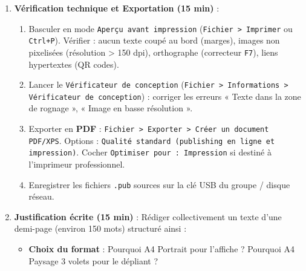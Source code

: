 \documentclass[11pt]{article}
\newcommand{\cle}[1]{{\popxbold\color{popdark}#1}}
\begin{document}
\begin{enumerate}
\begin{enumerate}
        \item \textbf{Volet 1 (Couverture)} : Reprendre l'identité visuelle de l'affiche (cohérence), titre, dates, image accrocheuse, mention \og Programme détaillé à l'intérieur \fg{}.
        \item \textbf{Volets 2 à 5 (Intérieur)} : Structurer le programme par jour. Utiliser des \cle{colonnes} (2 colonnes par volet) ou un tableau inséré pour aligner Heure / Événement / Lieu. Une police lisible (corps 10-11 pt), interligne 1,15.
        \item \textbf{Volet 6 (Dos/Rabat)} : Partenaires (logos alignés), Contacts, Mentions légales (ex: \og Publication Club Informatique - Collège La Réussite \fg{}), QR Code inscription ateliers.
        \item Utiliser les \cle{gabarits} (menu \texttt{Disposition > Gabarits}) pour poser les éléments fixes (fond coloré, numérotation de page, logo filigrane) sur toutes les pages intérieures d'un coup.
    \end{enumerate}
    \item \textbf{Vérification technique et Exportation (15 min)} :
    \begin{enumerate}
        \item Basculer en mode \texttt{Aperçu avant impression} (\texttt{Fichier > Imprimer} ou \texttt{Ctrl+P}). Vérifier : aucun texte coupé au bord (marges), images non pixelisées (résolution > 150 dpi), orthographe (correcteur \texttt{F7}), liens hypertextes (QR codes).
        \item Lancer le \texttt{Vérificateur de conception} (\texttt{Fichier > Informations > Vérificateur de conception}) : corriger les erreurs « Texte dans la zone de rognage », « Image en basse résolution ».
        \item Exporter en \textbf{PDF} : \texttt{Fichier > Exporter > Créer un document PDF/XPS}. Options : \texttt{Qualité standard (publishing en ligne et impression)}. Cocher \texttt{Optimiser pour : Impression} si destiné à l'imprimeur professionnel.
        \item Enregistrer les fichiers \texttt{.pub} sources sur la clé USB du groupe / disque réseau.
    \end{enumerate}
    \item \textbf{Justification écrite (15 min)} : Rédiger collectivement un texte d'une demi-page (environ 150 mots) structuré ainsi :
    \begin{itemize}
        \item \textbf{Choix du format} : Pourquoi A4 Portrait pour l'affiche ? Pourquoi A4 Paysage 3 volets pour le dépliant ?

\end{itemize}
\end{enumerate}
\end{document}
